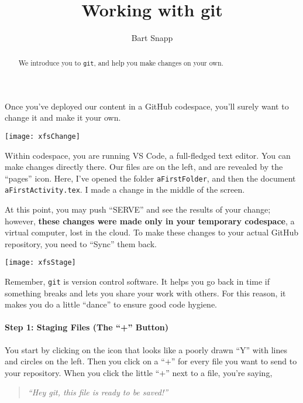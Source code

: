 \documentclass{ximera}
\author{Bart Snapp}
\title{Working with git}
\begin{document}
\pdfOnly{\onecolumn}
\begin{abstract}
    We introduce you to \texttt{git}, and help you make changes on your own.
\end{abstract}
\maketitle
Once you've deployed our content in a GitHub codespace, you'll surely want to
change it and  make it your own.
\begin{image}
    \texttt{[image: xfsChange]}
\end{image}
    Within codespace, you are running VS Code, a
    full-fledged text editor. You can make changes directly there. Our files
    are on
    the left, and are revealed by the ``pages'' icon.
    Here, I've opened the folder \verb!aFirstFolder!, and then the document
    \verb!aFirstActivity.tex!. I made a change in the middle of the screen.

    At this point, you may push ``SERVE'' and see the results of your change;
    however, \textbf{these changes were made only in your temporary codespace},
    a
    virtual
    computer, lost in the cloud. To make these changes to your actual GitHub
    repository, you need to ``Sync'' them back.
\pdfOnly{\end{multicols}}

\newpage

\begin{image}
    \texttt{[image: xfsStage]}
\end{image}

    Remember, \verb!git! is version control software.  It helps you go back in time if something breaks and lets you
    share
    your work with others. For this reason, it makes you do a little ``dance''
    to ensure good code hygiene.

    \paragraph{Step 1: Staging Files (The ``+'' Button)}

    You start by clicking on the icon that looks like a poorly drawn ``Y'' with
    lines and circles on the left. Then you click on a ``$\boldsymbol{+}$'' for every file you
    want
    to send to your repository.  When you click the little ``$\boldsymbol{+}$'' next
    to a
    file, you're saying,
    \begin{quote}
        \emph{``Hey git, this file is ready to be saved!''}
    \end{quote}
\end{document}
